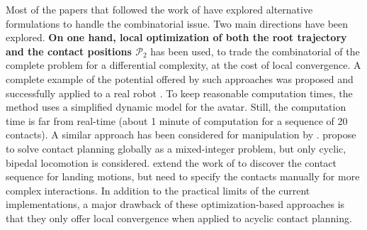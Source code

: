 Most of the papers that followed the work of \citeauthor{Bretl:2006:MPM:1124573.1124585} have explored alternative formulations to handle the combinatorial issue. Two main directions have been explored. \textbf{On one hand, local optimization of both the root trajectory \Pa and the contact positions $\mathcal{P}_2$} has been used, to trade the combinatorial of the complete problem for a differential complexity, at the cost of local convergence. A complete example of the potential offered by such approaches was proposed \citep{Mordatch:2012:DCB:2185520.2185539} and successfully applied to a real robot \citep{mordatch2015}. To keep reasonable computation times, the method uses a simplified dynamic model for the avatar. Still, the computation time is far from real-time  (about 1 minute of computation for a sequence of 20 contacts).  A similar approach has been considered for manipulation by \cite{gabicciniisrr15}. \citeauthor{DBLP:conf/humanoids/DeitsT14} propose to solve contact planning globally as a mixed-integer problem, but only cyclic, bipedal locomotion is considered. 
\citeauthor{dai2014whole} extend the work of \citeauthor{Posa:2014:DMT:2568343.2568352} to discover the contact sequence for landing motions, but need to specify
the contacts manually for more complex interactions.
In addition to the practical limits of the current implementations, a major drawback of these optimization-based approaches is that they only offer local convergence when applied to acyclic contact planning.

